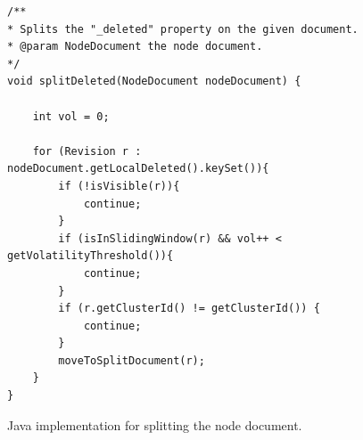 \documentclass[abstracton,12pt]{scrartcl}
\theoremstyle{definition}
\begin{document}
\begin{figure}
    \begin{framed}
        \begin{scriptsize}
            \begin{verbatim}
/**
* Splits the "_deleted" property on the given document.
* @param NodeDocument the node document.
*/
void splitDeleted(NodeDocument nodeDocument) {

    int vol = 0;

    for (Revision r : nodeDocument.getLocalDeleted().keySet()){
        if (!isVisible(r)){
            continue;
        }
        if (isInSlidingWindow(r) && vol++ < getVolatilityThreshold()){
            continue;
        }
        if (r.getClusterId() != getClusterId()) {
            continue;
        }
        moveToSplitDocument(r);
    }
}
            \end{verbatim}
        \end{scriptsize}
    \end{framed}
    \caption{Java implementation for splitting the node document.}
    \label{fig:split_document}
\end{figure}
\end{document}
